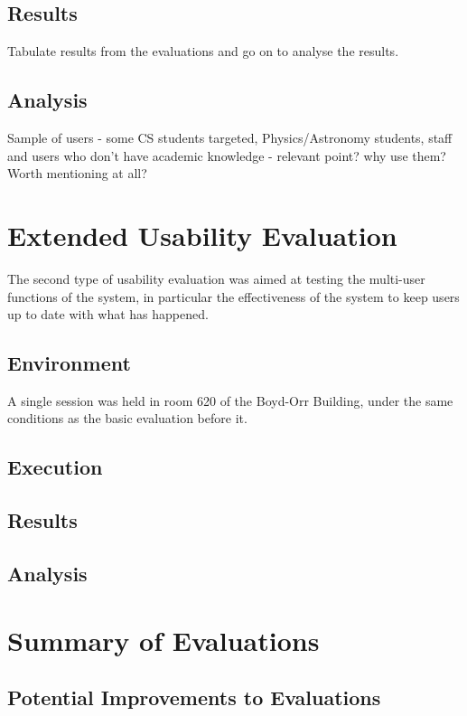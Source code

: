 \subsection{Results}
Tabulate results from the evaluations and go on to analyse the results.

\subsection{Analysis}
Sample of users - some CS students targeted, Physics/Astronomy students, staff and users who don't have academic knowledge - relevant point? why use them? Worth mentioning at all?

\section{Extended Usability Evaluation}
The second type of usability evaluation was aimed at testing the multi-user functions of the system, in particular the effectiveness of the system to keep users up to date with what has happened. 

\subsection{Environment}
A single session was held in room 620 of the Boyd-Orr Building, under the same conditions as the basic evaluation before it.

\subsection{Execution}

\subsection{Results}
\subsection{Analysis}

\section{Summary of Evaluations}

\subsection{Potential Improvements to Evaluations}
